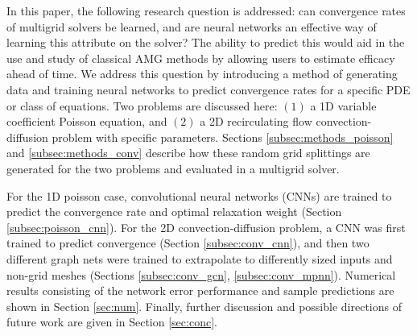 \documentclass[review]{siamart190516}
\begin{document}
In this paper, the following research question is addressed: can convergence rates of multigrid solvers be learned, and are neural networks an effective way of learning this attribute on the solver?  The ability to predict this would aid in the use and study of classical AMG methods by allowing users to estimate efficacy ahead of time.  We address this question by introducing a method of generating data and training neural networks to predict convergence rates for a specific PDE or class of equations.  Two problems are discussed here: $(1)$ a 1D variable coefficient Poisson equation, and $(2)$ a 2D recirculating flow convection-diffusion problem with specific parameters.  Sections \ref{subsec:methods_poisson} and \ref{subsec:methods_conv} describe how these random grid splittings are generated for the two problems and evaluated in a multigrid solver.

For the 1D poisson case, convolutional neural networks (CNNs) are trained to predict the convergence rate and optimal relaxation weight (Section \ref{subsec:poisson_cnn}).  For the 2D convection-diffusion problem, a CNN was first trained to predict convergence (Section \ref{subsec:conv_cnn}), and then two different graph nets were trained to extrapolate to differently sized inputs and non-grid meshes (Sections \ref{subsec:conv_gcn}, \ref{subsec:conv_mpnn}).  Numerical results consisting of the network error performance and sample predictions are shown in Section \ref{sec:num}.  Finally, further discussion and possible directions of future work are given in Section \ref{sec:conc}.


\end{document}

